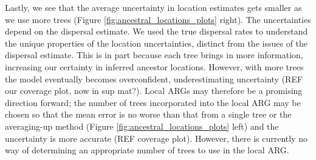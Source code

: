 Lastly, we see that the average uncertainty in location estimates gets smaller as we use more trees (Figure \ref{fig:ancestral_locations_plots} right). The uncertainties depend on the dispersal estimate. We used the true dispersal rates to understand the unique properties of the location uncertainties, distinct from the issues of the dispersal estimate. This is in part because each tree brings in more information, increasing our certainty in inferred ancestor locations. However, with more trees the model eventually becomes overconfident, underestimating uncertainty (REF our coverage plot, now in sup mat?). Local ARGs may therefore be a promising direction forward; the number of trees incorporated into the local ARG may be chosen so that the mean error is no worse than that from a single tree or the averaging-up method (Figure \ref{fig:ancestral_locations_plots} left) and the uncertainty is more accurate (REF coverage plot). However, there is currently no way of determining an appropriate number of trees to use in the local ARG. 








